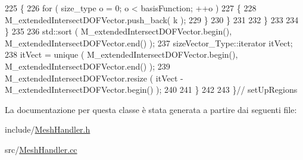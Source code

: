 \begin{DoxyCode}
225                         \{
226                                 \textcolor{keywordflow}{for} ( size\_type o = 0; o < basisFunction; ++o )
227                                 \{
228                                         M\_extendedIntersectDOFVector.push\_back( k );
229                                 \}
230                         \}
231 
232                 \}
233 
234         \}
235 
236         std::sort ( M\_extendedIntersectDOFVector.begin(), M\_extendedIntersectDOFVector.end() );
237         sizeVector\_Type::iterator itVect;
238         itVect = unique ( M\_extendedIntersectDOFVector.begin(), M\_extendedIntersectDOFVector.end() );
239         M\_extendedIntersectDOFVector.resize ( itVect - M\_extendedIntersectDOFVector.begin() );
240 
241     \}
242 
243 \}\textcolor{comment}{// setUpRegions}
\end{DoxyCode}


La documentazione per questa classe è stata generata a partire dai seguenti file\-:\begin{DoxyCompactItemize}
\item 
include/\hyperlink{MeshHandler_8h}{Mesh\-Handler.\-h}\item 
src/\hyperlink{MeshHandler_8cc}{Mesh\-Handler.\-cc}\end{DoxyCompactItemize}
